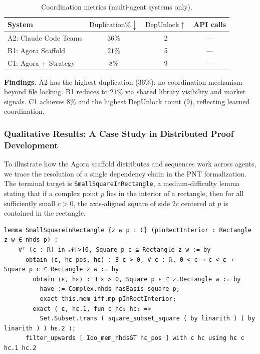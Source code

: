 \begin{table}[ht]
\centering
\caption{Coordination metrics (multi-agent systems only).}
\label{tab:coordination}
\begin{tabular}{l|ccc}
\toprule
\textbf{System} & $\mathrm{Duplication\%}\downarrow$ & $\mathrm{DepUnlock}\uparrow$ & API calls \\
\midrule
A2: Claude Code Teams & $36\%$ & 2 & --- \\
B1: Agora Scaffold & $21\%$ & 5 & --- \\
C1: Agora + Strategy & $8\%$ & 9 & --- \\
\bottomrule
\end{tabular}
\end{table}

\textbf{Findings.} A2 has the highest duplication ($36\%$): no coordination mechanism beyond file locking. B1 reduces to $21\%$ via shared library visibility and market signals. C1 achieves $8\%$ and the highest DepUnlock count ($9$), reflecting learned coordination.



\subsubsection{Qualitative Results: A Case Study in Distributed Proof Development}\label{sec:qualitative}
 
To illustrate how the Agora scaffold distributes and sequences work across agents, we trace the resolution of a single dependency chain in the PNT formalization. The terminal target is \texttt{SmallSquareInRectangle}, a medium-difficulty lemma stating that if a complex point $p$ lies in the interior of a rectangle, then for all sufficiently small $c > 0$, the axis-aligned square of side $2c$ centered at $p$ is contained in the rectangle.
 
\begin{lstlisting}[caption={Target lemma \texttt{SmallSquareInRectangle} (lines 826--835).},label={lst:target}]
lemma SmallSquareInRectangle {z w p : ℂ} (pInRectInterior : Rectangle z w ∈ nhds p) :
    ∀ᶠ (c : ℝ) in 𝓝[>]0, Square p c ⊆ Rectangle z w := by
      obtain ⟨ε, hε_pos, hε⟩ : ∃ ε > 0, ∀ c : ℝ, 0 < c → c < ε → Square p c ⊆ Rectangle z w := by
        obtain ⟨ε, hε⟩ : ∃ ε > 0, Square p ε ⊆ z.Rectangle w := by
          have := Complex.nhds_hasBasis_square p;
          exact this.mem_iff.mp pInRectInterior;
        exact ⟨ ε, hε.1, fun c hc₁ hc₂ =>
          Set.Subset.trans ( square_subset_square ( by linarith ) ( by linarith ) ) hε.2 ⟩;
      filter_upwards [ Ioo_mem_nhdsGT hε_pos ] with c hc using hε c hc.1 hc.2
\end{lstlisting}
 
